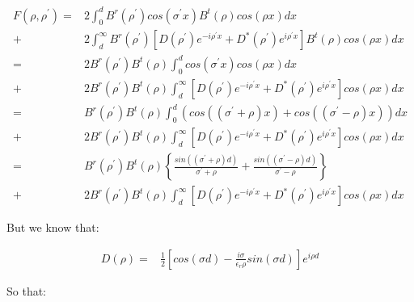 \documentclass[11pt, oneside]{article}   	%
\begin{document}
\begin{align*}
F\left(\rho,\rho^{\prime}\right)= & 2\int_{0}^{d}B^{r}\left(\rho^{\prime}\right)cos\left(\sigma^{\prime}x\right)B^{t}\left(\rho\right)cos\left(\rho x\right)dx\\
+ & 2\int_{d}^{\infty}B^{r}\left(\rho^{\prime}\right)\left[D\left(\rho^{\prime}\right)e^{-i\rho^{\prime}x}+D^{*}\left(\rho^{\prime}\right)e^{i\rho^{\prime}x}\right]B^{t}\left(\rho\right)cos\left(\rho x\right)dx\\
= & 2B^{r}\left(\rho^{\prime}\right)B^{t}\left(\rho\right)\int_{0}^{d}cos\left(\sigma^{\prime}x\right)cos\left(\rho x\right)dx\\
+ & 2B^{r}\left(\rho^{\prime}\right)B^{t}\left(\rho\right)\int_{d}^{\infty}\left[D\left(\rho^{\prime}\right)e^{-i\rho^{\prime}x}+D^{*}\left(\rho^{\prime}\right)e^{i\rho^{\prime}x}\right]cos\left(\rho x\right)dx\\
= & B^{r}\left(\rho^{\prime}\right)B^{t}\left(\rho\right)\int_{0}^{d}\left(cos\left(\left(\sigma^{\prime}+\rho\right)x\right)+cos\left(\left(\sigma^{\prime}-\rho\right)x\right)\right)dx\\
+ & 2B^{r}\left(\rho^{\prime}\right)B^{t}\left(\rho\right)\int_{d}^{\infty}\left[D\left(\rho^{\prime}\right)e^{-i\rho^{\prime}x}+D^{*}\left(\rho^{\prime}\right)e^{i\rho^{\prime}x}\right]cos\left(\rho x\right)dx\\
= & B^{r}\left(\rho^{\prime}\right)B^{t}\left(\rho\right)\left\{ \frac{sin\left(\left(\sigma^{\prime}+\rho\right)d\right)}{\sigma^{\prime}+\rho}+\frac{sin\left(\left(\sigma^{\prime}-\rho\right)d\right)}{\sigma^{\prime}-\rho}\right\} \\
+ & 2B^{r}\left(\rho^{\prime}\right)B^{t}\left(\rho\right)\int_{d}^{\infty}\left[D\left(\rho^{\prime}\right)e^{-i\rho^{\prime}x}+D^{*}\left(\rho^{\prime}\right)e^{i\rho^{\prime}x}\right]cos\left(\rho x\right)dx
\end{align*}


But we know that: 

\begin{align*}
D\left(\rho\right)= & \frac{1}{2}\left[cos\left(\sigma d\right)-\frac{i\sigma}{\epsilon_{r}\rho}sin\left(\sigma d\right)\right]e^{i\rho d}
\end{align*}


So that: 
\end{document}

